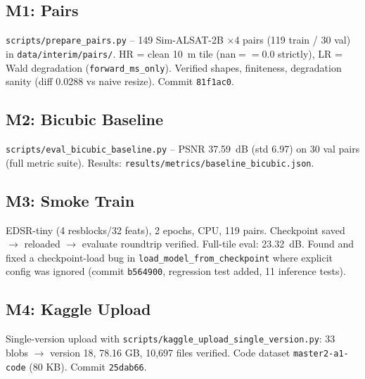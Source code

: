\subsection{M1: Pairs}
\texttt{scripts/prepare\_pairs.py} -- 149 Sim-ALSAT-2B $\times$4 pairs (119 train / 30 val) in \texttt{data/interim/pairs/}. HR = clean 10~m tile (nan$==0.0$ strictly), LR = Wald degradation (\texttt{forward\_ms\_only}). Verified shapes, finiteness, degradation sanity (diff 0.0288 vs naive resize). Commit \texttt{81f1ac0}.

\subsection{M2: Bicubic Baseline}
\texttt{scripts/eval\_bicubic\_baseline.py} -- PSNR 37.59~dB (std 6.97) on 30 val pairs (full metric suite). Results: \texttt{results/metrics/baseline\_bicubic.json}.

\subsection{M3: Smoke Train}
EDSR-tiny (4 resblocks/32 feats), 2 epochs, CPU, 119 pairs. Checkpoint saved $\to$ reloaded $\to$ evaluate roundtrip verified. Full-tile eval: 23.32~dB. Found and fixed a checkpoint-load bug in \texttt{load\_model\_from\_checkpoint} where explicit config was ignored (commit \texttt{b564900}, regression test added, 11 inference tests).

\subsection{M4: Kaggle Upload}
Single-version upload with \texttt{scripts/kaggle\_upload\_single\_version.py}: 33 blobs $\to$ version 18, 78.16 GB, 10,697 files verified. Code dataset \texttt{master2-a1-code} (80 KB). Commit \texttt{25dab66}.
